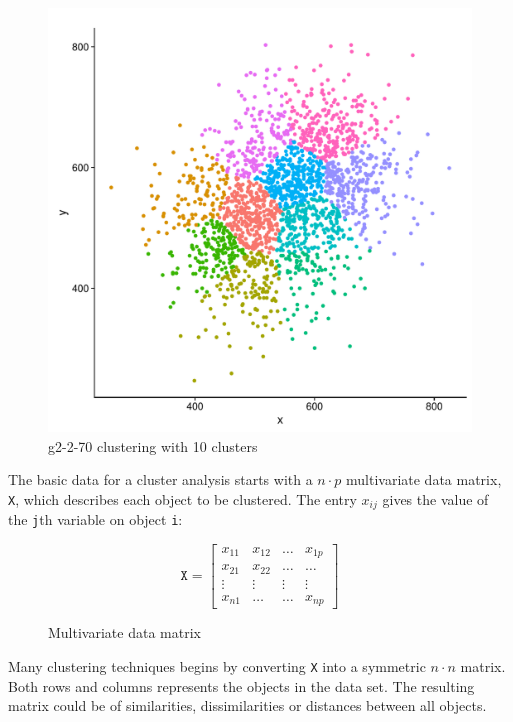 \documentclass[a4paper,10pt]{article}
\theoremstyle{plain}
\theoremstyle{definition}
\begin{document}
\begin{figure}[H]
	\centering
	\includegraphics[scale=0.4]{./pictures/G2/g2-2-70-k10.pdf}
	\caption{g2-2-70 clustering with 10 clusters}
	\label{fig:g2-2-70-k10}
\end{figure}
The basic data for a cluster analysis starts with a $n \cdot p$ multivariate data matrix, \texttt{X}, which describes each object to be clustered. The entry $x_{ij}$ gives the value of the \texttt{j}th variable on object \texttt{i}:
\begin{figure}[H]
	\centering
	\[
	\texttt{X}
	=
	\begin{bmatrix}
	x_{11} & x_{12} & \dots & x_{1p} \\
	x_{21} & x_{22} & \dots & \dots \\
	\vdots & \vdots & \vdots & \vdots \\
	x_{n1} & \dots & \dots & x_{np}
	\end{bmatrix}
	\]
	\caption{Multivariate data matrix}
	\label{fig:dataMatrix}
\end{figure}

Many clustering techniques begins by converting \texttt{X} into a symmetric $n \cdot n$ matrix. Both rows and columns represents the objects in the data set. The resulting matrix could be of similarities, dissimilarities or distances between all objects.\\
\end{document}
